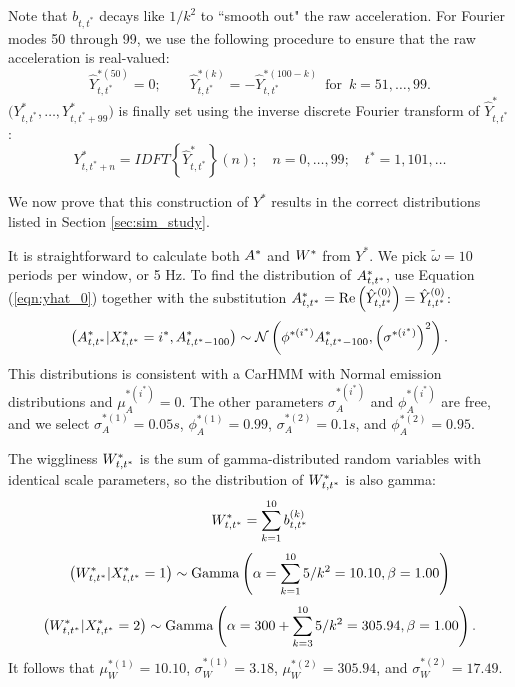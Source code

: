 Note that $b_{t,t^*}$ decays like $1/k^2$ to ``smooth out" the raw acceleration. For Fourier modes 50 through 99, we use the following procedure to ensure that the raw acceleration is real-valued:
$$
    \hat{Y}^{*(50)}_{t,t^*} = 0; \qquad
	\hat{Y}^{*(k)}_{t,t^*} = -\hat{Y}^{*(100-k)}_{t,t^*} \enspace \text{for} \enspace k = 51,\ldots,99.
$$
%
$\Big(Y^*_{t,t^*},\ldots,Y^*_{t,t^*+99}\Big)$ is finally set using the inverse discrete Fourier transform of $\hat{Y}^*_{t,t^*}$:
%
$$Y^*_{t,t^*+n} = IDFT\left\{\hat{Y}^*_{t,t^*}\right\}(n); \quad n = 0,\ldots,99; \quad t^* = 1,101,\ldots$$
%

We now prove that this construction of $Y^*$ results in the correct distributions listed in Section \ref{sec:sim_study}. 

It is straightforward to calculate both $A^*$ and $W^*$ from $Y^*$. We pick $\tilde{\omega} = 10$ periods per window, or 5 Hz. To find the distribution of $A^*_{t,t^*}$, use Equation (\ref{eqn:yhat_0}) together with the substitution $A^*_{t,t^*} = \text{Re}\left(\hat{Y}^{(0)}_{t,t^*}\right) = \hat{Y}^{(0)}_{t,t^*}$:
%
$$\left(A^*_{t,t^*} | X^*_{t,t^*} = i^*, A^*_{t,t^*-100} \right) \sim \mathcal{N} \left(\phi^{*(i^*)} A^*_{t,t^*-100}, \left(\sigma^{*(i^*)}\right)^2 \right).$$
%
This distributions is consistent with a CarHMM with Normal emission distributions and $\mu_A^{*(i^*)} = 0$. The other parameters $\sigma_A^{*(i^*)}$ and $\phi_A^{*(i^*)}$ are free, and we select $\sigma_A^{*(1)} = 0.05s$, $\phi_A^{*(1)} = 0.99$, $\sigma_A^{*(2)} = 0.1s$, and $\phi_A^{*(2)} = 0.95$.

The wiggliness $W^*_{t,t^*}$ is the sum of gamma-distributed random variables with identical scale parameters, so the distribution of $W^*_{t,t^*}$ is also gamma:
%
$$W^*_{t,t^*} = \sum_{k=1}^{10} b^{(k)}_{t,t^*}$$
%
$$\left(W^*_{t,t^*}|X^*_{t,t^*} = 1\right) \sim {\rm{Gamma}}\left(\alpha = \sum_{k=1}^{10} 5/k^2 = 10.10, \beta = 1.00 \right)$$
%
$$\left(W^*_{t,t^*}|X^*_{t,t^*} = 2\right) \sim {\rm{Gamma}}\left(\alpha = 300 + \sum_{k=3}^{10} 5/k^2 = 305.94 , \beta = 1.00 \right).$$
%
It follows that $\mu_W^{*(1)} = 10.10$, $\sigma_W^{*(1)} = 3.18$, $\mu_W^{*(2)} = 305.94$, and $\sigma_W^{*(2)} = 17.49$.

